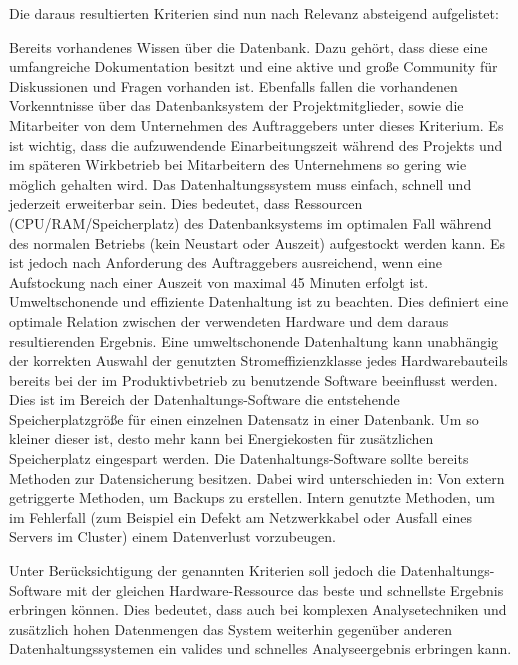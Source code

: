 Die daraus resultierten Kriterien sind nun nach Relevanz absteigend
aufgelistet:
\begin{outline}
  \1 Bereits vorhandenes Wissen über die Datenbank. Dazu gehört, dass diese
  eine umfangreiche Dokumentation besitzt und eine aktive und große Community
  für Diskussionen und Fragen vorhanden ist. Ebenfalls fallen die vorhandenen
  Vorkenntnisse über das Datenbanksystem der Projektmitglieder, sowie die
  Mitarbeiter von dem Unternehmen des Auftraggebers unter dieses Kriterium. Es
  ist wichtig, dass die aufzuwendende Einarbeitungszeit während des Projekts
  und im späteren Wirkbetrieb bei Mitarbeitern des Unternehmens so gering wie
  möglich gehalten wird.
  \1 Das Datenhaltungssystem muss einfach, schnell und jederzeit erweiterbar
  sein. Dies bedeutet, dass Ressourcen (CPU/RAM/Speicherplatz) des
  Datenbanksystems im optimalen Fall während des normalen Betriebs (kein
  Neustart oder Auszeit) aufgestockt werden kann. Es ist jedoch nach
  Anforderung des Auftraggebers ausreichend, wenn eine Aufstockung nach einer
  Auszeit von maximal 45 Minuten erfolgt ist.
  \1 Umweltschonende und effiziente Datenhaltung ist zu beachten. Dies
  definiert eine optimale Relation zwischen der verwendeten Hardware und dem
  daraus resultierenden Ergebnis. Eine umweltschonende Datenhaltung kann
  unabhängig der korrekten Auswahl der genutzten Stromeffizienzklasse jedes
  Hardwarebauteils bereits bei der im Produktivbetrieb zu benutzende Software
  beeinflusst werden. Dies ist im Bereich der Datenhaltungs\hyp{}Software die
  entstehende Speicherplatzgröße für einen einzelnen Datensatz in einer
  Datenbank. Um so kleiner dieser ist, desto mehr kann bei Energiekosten für
  zusätzlichen Speicherplatz eingespart werden.
  \1 Die Datenhaltungs\hyp{}Software sollte bereits Methoden zur Datensicherung
  besitzen. Dabei wird unterschieden in:
    \2 Von extern getriggerte Methoden, um Backups zu erstellen.
    \2 Intern genutzte Methoden, um im Fehlerfall (zum Beispiel ein Defekt am
    Netzwerkkabel oder Ausfall eines Servers im Cluster) einem Datenverlust
    vorzubeugen.
\end{outline}

Unter Berücksichtigung der genannten Kriterien soll jedoch die
Datenhaltungs\hyp{}Software mit der gleichen Hardware\hyp{}Ressource das beste
und schnellste Ergebnis erbringen können. Dies bedeutet, dass auch bei
komplexen Analysetechniken und zusätzlich hohen Datenmengen das System
weiterhin gegenüber anderen Datenhaltungssystemen ein valides und schnelles
Analyseergebnis erbringen kann.
\nl%

